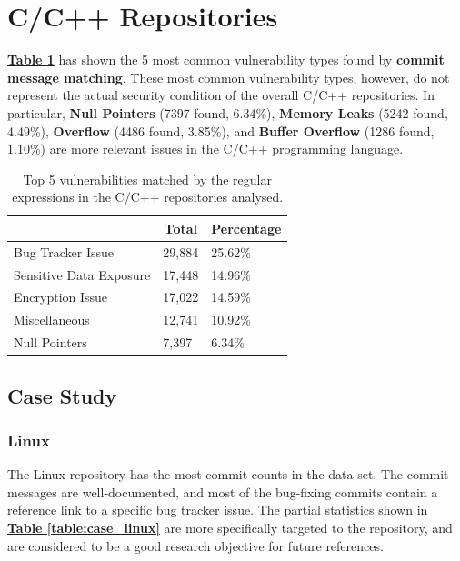 \documentclass[12pt, a4paper]{report}
\begin{document}
\section{C/C++ Repositories}
\hyperref[table:top5_c]{\textbf{Table \ref*{table:top5_c}}} has shown the 5 most common
vulnerability types found by \textbf{commit message matching}. These most common vulnerability
types, however, do not represent the actual security condition of the overall C/C++ repositories. In
particular, \textbf{Null Pointers} (7397 found, 6.34\%), \textbf{Memory Leaks} (5242 found, 4.49\%),
\textbf{Overflow} (4486 found, 3.85\%), and \textbf{Buffer Overflow} (1286 found, 1.10\%) are more
relevant issues in the C/C++ programming language.

\begin{table}[H]
  \centering
  \begin{tabular}{|l|l|l|}
    \hline \rowcolor[HTML]{D8D8D8}
    \multicolumn{1}{|c|}{Vulnerabilities} & \multicolumn{1}{|c|}{Total} &
    \multicolumn{1}{|c|}{Percentage} \\ \hline
    Bug Tracker Issue & 29,884 & 25.62\% \\
    Sensitive Data Exposure & 17,448 & 14.96\% \\
    Encryption Issue & 17,022 & 14.59\% \\
    Miscellaneous & 12,741 & 10.92\% \\
    Null Pointers & 7,397 & 6.34\% \\ \hline
  \end{tabular}
  \caption{Top 5 vulnerabilities matched by the regular expressions in the C/C++ repositories
  analysed.}
  \label{table:top5_c}
\end{table}

\subsection{Case Study}
\subsubsection*{Linux}
The Linux repository \cite{linux_repo} has the most commit counts in the data set. The commit
messages are well-documented, and most of the bug-fixing commits contain a reference link to a
specific bug tracker issue. The partial statistics shown in
\hyperref[table:case_linux]{\textbf{Table \ref*{table:case_linux}}} are more specifically targeted
to the repository, and are considered to be a good research objective for future references.
\end{document}
